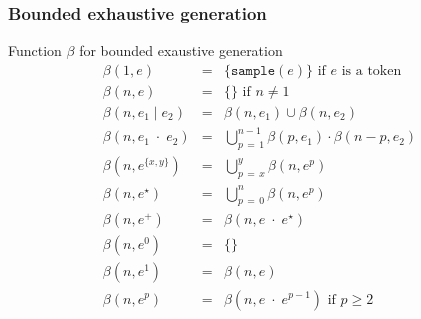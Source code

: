 \documentclass[9pt]{beamer}
\newcommand{\code}[1]{\texttt{#1}}
\begin{document}
\begin{frame}
\frametitle{Bounded exhaustive generation}

\begin{block}{Function $\beta$ for bounded exaustive generation}
\footnotesize
\begin{eqnarray}
\beta(1, e) & = & \{\code{sample}(e)\} \text{ \ \ if $e$ is a token} \nonumber \\ 
\beta(n, e) & = & \{\} \text{ \ \ if } n \neq 1 \nonumber \\
\beta(n, e_1 \;\vert\; e_2) & = & \beta(n,e_1) \cup \beta(n,e_2) \nonumber \\
\beta(n, e_1 \;\cdot\; e_2) & = & \bigcup_{p\,=\,1}^{n-1}
                                  \beta(p,e_1) \cdot \beta(n - p,e_2) \nonumber \\
\beta(n, e^{\{x,y\}}) & = & \bigcup_{p\,=\,x}^{y} \beta(n,e^{p}) \nonumber \\
\beta(n, e^{\star}) & = & \bigcup_{p\,=\,0}^{n} \beta(n,e^{p}) \nonumber \\
\beta(n,e^{+}) & = & \beta(n, e \;\cdot\; e^{\star}) \nonumber \\
\beta(n,e^{0}) & = & \{\} \nonumber \\
\beta(n,e^{1}) & = & \beta(n,e) \nonumber \\
\beta(n,e^{p}) & = & \beta(n, e \;\cdot\; e^{p-1})\text{ \ \ if } p \ge 2
\nonumber
\end{eqnarray}
\end{block}

\end{frame}
\end{document}
